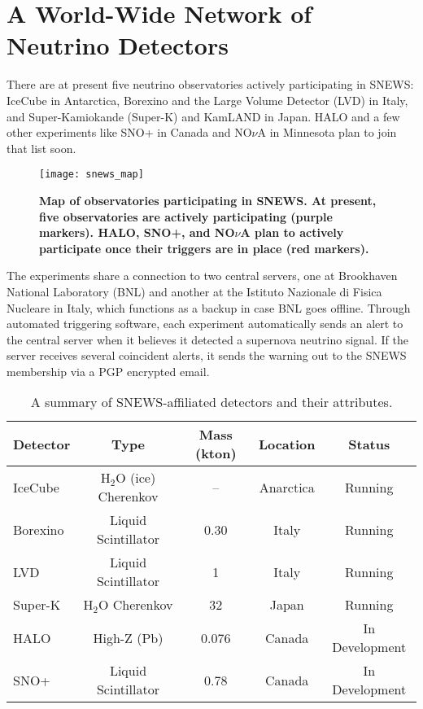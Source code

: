 	\section{A World-Wide Network of Neutrino Detectors}
	There are at present five neutrino observatories actively participating in SNEWS: IceCube in Antarctica, Borexino and the Large Volume Detector (LVD) in Italy, and Super-Kamiokande (Super-K) and KamLAND in Japan. HALO and a few other experiments like SNO+ in Canada and NO$\nu$A in Minnesota plan to join that list soon. 
		\begin{figure}[H]
		\centering
		\texttt{[image: snews\_map]}
		\caption[Map of Observatories Participating in SNEWS]{\bf Map of observatories participating in SNEWS. \rm At present, five observatories are actively participating (purple markers). HALO, SNO+, and NO$\nu$A plan to actively participate once their triggers are in place (red markers).}
		\label{fig:snews_map}
	\end{figure}

	The experiments share a connection to two central servers, one at Brookhaven National Laboratory (BNL) and another at the Istituto Nazionale di Fisica Nucleare in Italy, which functions as a backup in case BNL goes offline. Through automated triggering software, each experiment automatically sends an alert to the central server when it believes it detected a supernova neutrino signal. If the server receives several coincident alerts, it sends the warning out to the SNEWS membership via a PGP encrypted email. 

	\begin{table}[H]
		\centering
		\caption[Summary of SNEWS Detectors]{A summary of SNEWS-affiliated detectors and their attributes\cite{Antonioli2004}.}
		\label{table:snews_detectors}
			\begin{tabular}{lcccc}
				\toprule
				Detector & Type & Mass (kton) & Location & Status \\
				\midrule
				IceCube & H$_2$O (ice) Cherenkov & -- & Anarctica & Running \\
				Borexino & Liquid Scintillator & 0.30 & Italy & Running \\
				LVD & Liquid Scintillator & 1 & Italy & Running \\
				Super-K & H$_2$O Cherenkov 	& 32 & Japan & Running \\
				HALO & High-Z (Pb) & 0.076 & Canada & In Development \\
				SNO+ & Liquid Scintillator & 0.78 & Canada & In Development \\
				\bottomrule
			\end{tabular}
	\end{table}


